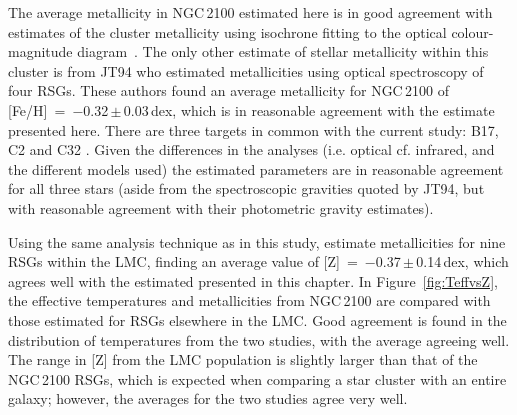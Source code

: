 The average metallicity in NGC\,2100 estimated here is in good agreement with estimates of the cluster metallicity using isochrone fitting to the optical colour-magnitude diagram~\citep[$-$0.34\,dex;][]{2015A&A...575A..62N}.
The only other estimate of stellar metallicity within this cluster is from JT94
who estimated metallicities using optical spectroscopy of four RSGs.
These authors found an average metallicity for NGC\,2100 of [Fe/H]~=~$-$0.32\,$\pm$\,0.03\,dex, which is in reasonable agreement with the estimate presented here.
There are three targets in common with the current study: B17, C2 and C32
\citep[using the][nomenclature]{1974A&AS...15..261R}.
Given the differences in the analyses (i.e. optical cf. infrared, and the different models used) the estimated parameters are in reasonable agreement for all three stars
(aside from the spectroscopic gravities quoted by JT94, but with reasonable agreement with their photometric gravity estimates).

Using the same analysis technique as in this study,
\cite{2015ApJ...806...21D} estimate metallicities for nine RSGs within the LMC,
finding an average value of [Z]~=~$-$0.37\,$\pm$\,0.14\,dex, which agrees well with the estimated presented in this chapter.
In Figure~\ref{fig:TeffvsZ}, the effective temperatures and metallicities from NGC\,2100 are compared with those estimated for RSGs elsewhere in the LMC.
Good agreement is found in the distribution of temperatures from the two studies, with the average agreeing well.
The range in [Z] from the LMC population is slightly larger than that of the NGC\,2100 RSGs, which is expected when comparing a star cluster with an entire galaxy; however, the averages for the two studies agree very well.

